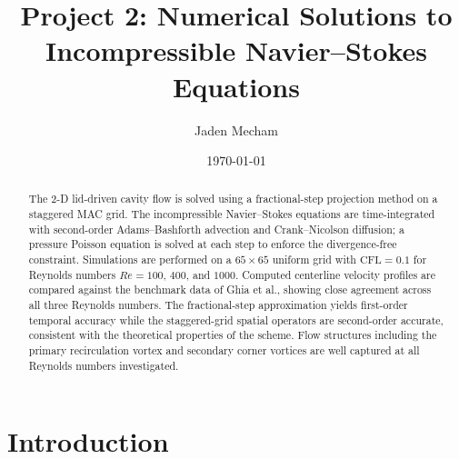 \documentclass[
  aapm,
  amsmath,amssymb,
  reprint,          %
  floatfix
]{revtex4-2}
\begin{document}
\title{Project 2: Numerical Solutions to Incompressible Navier--Stokes Equations}

\author{Jaden Mecham}

\date{\today}

\begin{abstract}
%
%
The 2-D lid-driven cavity flow is solved using a fractional-step projection method on
a staggered MAC grid. The incompressible Navier--Stokes equations are time-integrated
with second-order Adams--Bashforth advection and Crank--Nicolson diffusion; a pressure
Poisson equation is solved at each step to enforce the divergence-free constraint.
Simulations are performed on a $65\times65$ uniform grid with $\text{CFL}=0.1$ for
Reynolds numbers $Re=100$, $400$, and $1000$. Computed centerline velocity profiles are
compared against the benchmark data of Ghia et al., showing
close agreement across all three Reynolds numbers. The fractional-step approximation
yields first-order temporal accuracy while the staggered-grid spatial operators are
second-order accurate, consistent with the theoretical properties of the scheme. Flow
structures including the primary recirculation vortex and secondary corner vortices are
well captured at all Reynolds numbers investigated.
\end{abstract}

\maketitle

\section{Introduction}
%
%
\end{document}
